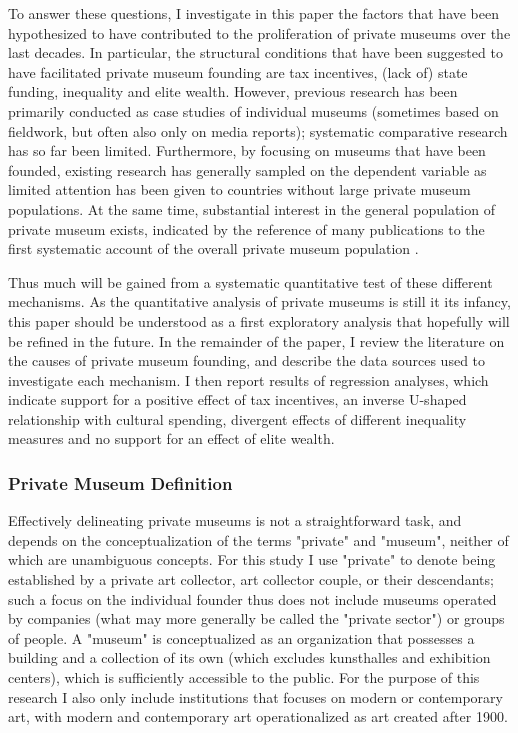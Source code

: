 \documentclass[11pt]{article}
\begin{document}
To answer these questions, I investigate in this paper the factors that have been hypothesized to have contributed to the proliferation of private museums over the last decades.
In particular, the structural conditions that have been suggested to have facilitated private museum founding are tax incentives, (lack of) state funding, inequality and elite wealth.
However, previous research has been primarily conducted as case studies of individual museums (sometimes based on fieldwork, but often also only on media reports); systematic comparative research has so far been limited.
Furthermore, by focusing on museums that have been founded, existing research has generally sampled on the dependent variable as limited attention has been given to countries without large private museum populations.
At the same time, substantial interest in the general population of private museum exists, indicated by the reference of many publications to the first systematic account of the overall private museum population \parencite{LarrysList_2015_report}. 

Thus much will be gained from a systematic quantitative test of these different mechanisms.
As the quantitative analysis of private museums is still it its infancy, this paper should be understood as a first exploratory analysis that hopefully will be refined in the future. 
In the remainder of the paper, I review the literature on the causes of private museum founding, and describe the data sources used to investigate each mechanism.
I then report results of regression analyses, which indicate support for a positive effect of tax incentives, an inverse U-shaped relationship with cultural spending, divergent effects of different inequality measures and no support for an effect of elite wealth.



\subsubsection*{Private Museum Definition}

Effectively delineating private museums is not a straightforward task, and depends on the conceptualization of the terms "private" and "museum", neither of which are unambiguous concepts.
For this study I use "private" to denote being established by a private art collector, art collector couple, or their descendants; such a focus on the individual founder thus does not include museums operated by companies (what may more generally be called the "private sector") or groups of people.
A "museum" is conceptualized as an organization that possesses a building and a collection of its own (which excludes kunsthalles and exhibition centers), which is sufficiently accessible to the public.
For the purpose of this research I also only include institutions that focuses on modern or contemporary art, with modern and contemporary art operationalized as art created after 1900. 
\end{document}
